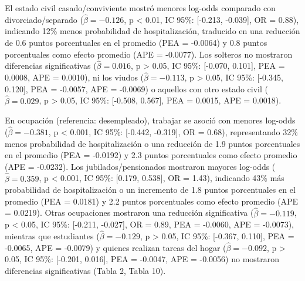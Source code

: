 \documentclass[
  spanish,
  10pt,
]{article}
\begin{document}
El estado civil casado/conviviente mostró menores log-odds comparado con
divorciado/separado (\(\hat{\beta} = -0.126\), p \textless{} 0.01, IC
95\%: {[}-0.213, -0.039{]}, OR = 0.88), indicando 12\% menos
probabilidad de hospitalización, traducido en una reducción de 0.6
puntos porcentuales en el promedio (PEA = -0.0064) y 0.8 puntos
porcentuales como efecto promedio (APE = -0.0077). Los solteros no
mostraron diferencias significativas (\(\hat{\beta} = 0.016\), p
\textgreater{} 0.05, IC 95\%: {[}-0.070, 0.101{]}, PEA = 0.0008, APE =
0.0010), ni los viudos (\(\hat{\beta} = -0.113\), p \textgreater{} 0.05,
IC 95\%: {[}-0.345, 0.120{]}, PEA = -0.0057, APE = -0.0069) o aquellos
con otro estado civil (\(\hat{\beta} = 0.029\), p \textgreater{} 0.05,
IC 95\%: {[}-0.508, 0.567{]}, PEA = 0.0015, APE = 0.0018).

En ocupación (referencia: desempleado), trabajar se asoció con menores
log-odds (\(\hat{\beta} = -0.381\), p \textless{} 0.001, IC 95\%:
{[}-0.442, -0.319{]}, OR = 0.68), representando 32\% menos probabilidad
de hospitalización o una reducción de 1.9 puntos porcentuales en el
promedio (PEA = -0.0192) y 2.3 puntos porcentuales como efecto promedio
(APE = -0.0232). Los jubilados/pensionados mostraron mayores log-odds
(\(\hat{\beta} = 0.359\), p \textless{} 0.001, IC 95\%: {[}0.179,
0.538{]}, OR = 1.43), indicando 43\% más probabilidad de hospitalización
o un incremento de 1.8 puntos porcentuales en el promedio (PEA = 0.0181)
y 2.2 puntos porcentuales como efecto promedio (APE = 0.0219). Otras
ocupaciones mostraron una reducción significativa
(\(\hat{\beta} = -0.119\), p \textless{} 0.05, IC 95\%: {[}-0.211,
-0.027{]}, OR = 0.89, PEA = -0.0060, APE = -0.0073), mientras que
estudiantes (\(\hat{\beta} = -0.129\), p \textgreater{} 0.05, IC 95\%:
{[}-0.367, 0.110{]}, PEA = -0.0065, APE = -0.0079) y quienes realizan
tareas del hogar (\(\hat{\beta} = -0.092\), p \textgreater{} 0.05, IC
95\%: {[}-0.201, 0.016{]}, PEA = -0.0047, APE = -0.0056) no mostraron
diferencias significativas (Tabla 2, Tabla 10).
\end{document}
